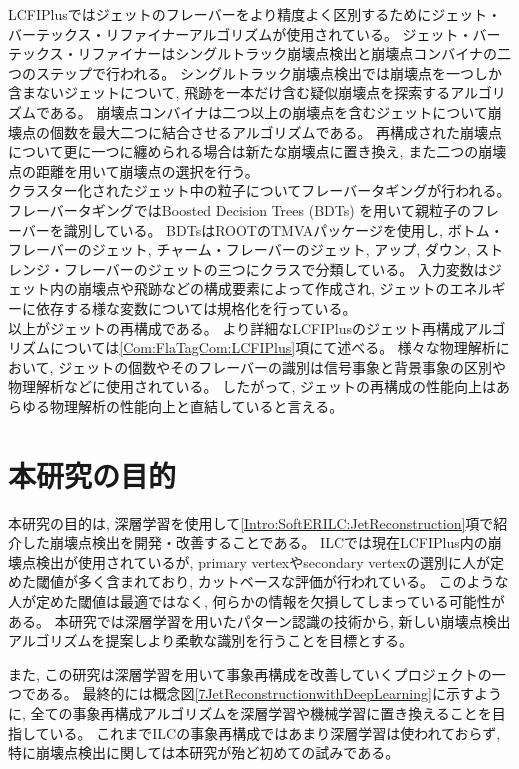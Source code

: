 LCFIPlusではジェットのフレーバーをより精度よく区別するためにジェット・バーテックス・リファイナーアルゴリズムが使用されている。
ジェット・バーテックス・リファイナーはシングルトラック崩壊点検出と崩壊点コンバイナの二つのステップで行われる。
シングルトラック崩壊点検出では崩壊点を一つしか含まないジェットについて, 飛跡を一本だけ含む疑似崩壊点を探索するアルゴリズムである。
崩壊点コンバイナは二つ以上の崩壊点を含むジェットについて崩壊点の個数を最大二つに結合させるアルゴリズムである。
再構成された崩壊点について更に一つに纏められる場合は新たな崩壊点に置き換え, また二つの崩壊点の距離を用いて崩壊点の選択を行う。\\

クラスター化されたジェット中の粒子についてフレーバータギングが行われる。
フレーバータギングではBoosted Decision Trees (BDTs) を用いて親粒子のフレーバーを識別している。
BDTsはROOTのTMVAパッケージを使用し, ボトム・フレーバーのジェット, チャーム・フレーバーのジェット, アップ, ダウン, ストレンジ・フレーバーのジェットの三つにクラスで分類している。
入力変数はジェット内の崩壊点や飛跡などの構成要素によって作成され, ジェットのエネルギーに依存する様な変数については規格化を行っている。\\

以上がジェットの再構成である。
より詳細なLCFIPlusのジェット再構成アルゴリズムについては\ref{Com:FlaTagCom:LCFIPlus}項にて述べる。
様々な物理解析において, ジェットの個数やそのフレーバーの識別は信号事象と背景事象の区別や物理解析などに使用されている。
したがって, ジェットの再構成の性能向上はあらゆる物理解析の性能向上と直結していると言える。


\section{本研究の目的} \label{Intro:Purpose}

本研究の目的は, 深層学習を使用して\ref{Intro:SoftERILC:JetReconstruction}項で紹介した崩壊点検出を開発・改善することである。
ILCでは現在LCFIPlus内の崩壊点検出が使用されているが, primary vertexやsecondary vertexの選別に人が定めた閾値が多く含まれており, カットベースな評価が行われている。
このような人が定めた閾値は最適ではなく, 何らかの情報を欠損してしまっている可能性がある。
本研究では深層学習を用いたパターン認識の技術から, 新しい崩壊点検出アルゴリズムを提案しより柔軟な識別を行うことを目標とする。

また, この研究は深層学習を用いて事象再構成を改善していくプロジェクトの一つである。
最終的には概念図\ref{7JetReconstructionwithDeepLearning}に示すように, 全ての事象再構成アルゴリズムを深層学習や機械学習に置き換えることを目指している。
これまでILCの事象再構成ではあまり深層学習は使われておらず, 特に崩壊点検出に関しては本研究が殆ど初めての試みである。

